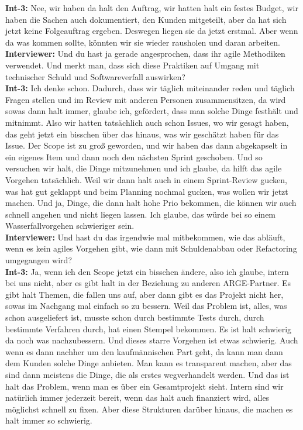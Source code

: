 \textbf{Int-3:} Nee, wir haben da halt den Auftrag, wir hatten halt ein festes Budget, wir haben die Sachen auch dokumentiert, den Kunden mitgeteilt, aber da hat sich jetzt keine Folgeauftrag ergeben. Deswegen liegen sie da jetzt erstmal. Aber wenn da was kommen sollte, könnten wir sie wieder rausholen und daran arbeiten. \\
\textbf{Interviewer:} Und du hast ja gerade angesprochen, dass ihr agile Methodiken verwendet. Und merkt man, dass sich diese Praktiken auf Umgang mit technischer Schuld und Softwareverfall auswirken?\\
\textbf{Int-3:} Ich denke schon. Dadurch, dass wir täglich miteinander reden und täglich Fragen stellen und im Review mit anderen Personen zusammensitzen, da wird sowas dann halt immer, glaube ich, gefördert, dass man solche Dinge festhält und mitnimmt. Also wir hatten tatsächlich auch schon Issues, wo wir gesagt haben, das geht jetzt ein bisschen über das hinaus, was wir geschätzt haben für das Issue. Der Scope ist zu groß geworden, und wir haben das dann abgekapselt in ein eigenes Item und dann noch den nächsten Sprint geschoben. Und so versuchen wir halt, die Dinge mitzunehmen und ich glaube, da hilft das agile Vorgehen tatsächlich. Weil wir dann halt auch in einem Sprint-Review gucken, was hat gut geklappt und beim Planning nochmal gucken, was wollen wir jetzt machen. Und ja, Dinge, die dann halt hohe Prio bekommen, die können wir auch schnell angehen und nicht liegen lassen. Ich glaube, das würde bei so einem Wasserfallvorgehen schwieriger sein. \\
\textbf{Interviewer:} Und hast du das irgendwie mal mitbekommen, wie das abläuft, wenn es kein agiles Vorgehen gibt, wie dann mit Schuldenabbau oder Refactoring umgegangen wird? \\
\textbf{Int-3:} Ja, wenn ich den Scope jetzt ein bisschen ändere, also ich glaube, intern bei uns nicht, aber es gibt halt in der Beziehung zu anderen ARGE-Partner. Es gibt halt Themen, die fallen uns auf, aber dann gibt es das Projekt nicht her, sowas im Nachgang mal einfach so zu bessern. Weil das Problem ist, alles, was schon ausgeliefert ist, musste schon durch bestimmte Tests durch, durch bestimmte Verfahren durch, hat einen Stempel bekommen. Es ist halt schwierig da noch was nachzubessern. Und dieses starre Vorgehen ist etwas schwierig. Auch wenn es dann nachher um den kaufmännischen Part geht, da kann man dann dem Kunden solche Dinge anbieten. Man kann es transparent machen, aber das sind dann meistens die Dinge, die als erstes wegverhandelt werden. Und das ist halt das Problem, wenn man es über ein Gesamtprojekt sieht. Intern sind wir natürlich immer jederzeit bereit, wenn das halt auch finanziert wird, alles möglichst schnell zu fixen. Aber diese Strukturen darüber hinaus, die machen es halt immer so schwierig. \\
